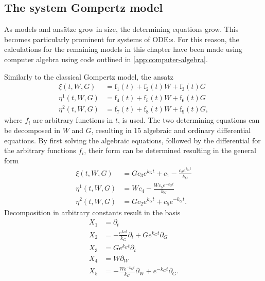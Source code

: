 \subsection{The system Gompertz model}

As models and ansätze grow in size, the determining equations grow.
This becomes particularly prominent for systems of ODE:s.
For this reason, the calculations for the remaining models in this chapter have been made using computer algebra using code outlined in \cref{app:computer-algebra}.

Similarly to the classical Gompertz model, the ansatz
\begin{align}
  \xi{\left(t,W,G \right)} &= \operatorname{f_{1}}{\left(t \right)} + \operatorname{f_{2}}{\left(t \right)} W + \operatorname{f_{3}}{\left(t \right)} G \\
  \eta^{1}{\left(t,W,G \right)} &= \operatorname{f_{4}}{\left(t \right)} + \operatorname{f_{5}}{\left(t \right)} W + \operatorname{f_{6}}{\left(t \right)} G\\
  \eta^{2}{\left(t,W,G \right)} &= \operatorname{f_{7}}{\left(t \right)} + \operatorname{f_{8}}{\left(t \right)} W + \operatorname{f_{9}}{\left(t \right)} G,
\end{align}
where \(f_i\) are arbitrary functions in \(t\), is used.
The two determining equations can be decomposed in \(W\) and \(G\), resulting in 15 algebraic and ordinary differential equations.
By first solving the algebraic equations, followed by the differential for the arbitrary functions \(f_i\), their form can be determined resulting in the general form
\begin{align}
  \xi{\left(t,W,G \right)} &= G c_{3} e^{k_{G} t} + c_{1} - \frac{c_{2} e^{k_{G} t}}{k_{G}} \\
  \eta^{1}{\left(t,W,G \right)} &= W c_{4} - \frac{W c_{5} e^{- k_{G} t}}{k_{G}} \\
  \eta^{2}{\left(t,W,G \right)} &= G c_{2} e^{k_{G} t} + c_{5} e^{- k_{G} t}.
\end{align}
Decomposition in arbitrary constants result in the basis
\begin{align}
  X_1 &= \partial_t \\
  X_2 &= - \frac{e^{k_{G} t}}{k_{G}} \partial_t + G e^{k_{G} t} \partial_G \\
  X_3 &= G e^{k_{G} t} \partial_t \\
  X_4 &= W \partial_W \\
  X_5 &= - \frac{W e^{- k_{G} t}}{k_{G}} \partial_W + e^{- k_{G} t} \partial_G.
\end{align}

